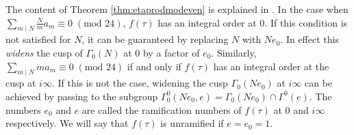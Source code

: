 \documentclass[11pt,a4paper]{amsart}
\theoremstyle{definition}
\begin{document}

The content of Theorem \ref{thm:etaprodmodeven} is explained in \cite[Section 1]{gordon1989multiplicative}. 
In the case when $\sum_{m \mid N} \frac{N}{m}a_m \equiv 0 \;(\textrm{mod }24)$, $f(\tau)$ has an integral order at 0. If this condition is not satisfied for $N$, it can be guaranteed by replacing $N$ with $Ne_0$. In effect this \emph{widens} the cusp of $\Gamma_0(N)$ at 0 by a factor of $e_0$. Similarly,  $\sum_{m \mid N} ma_m \equiv 0 \;(\textrm{mod }24)$ if and only if $f(\tau)$ has an integral order at the cusp at $i\infty$. If this is not the case, widening the cusp $\Gamma_0(Ne_0)$ at $i\infty$ can be achieved by passing to the subgroup $\Gamma_0^0(Ne_0,e)=\Gamma_0(Ne_0) \cap \Gamma^0(e)$. The numbers $e_0$ and $e$ are called the ramification numbers of $f(\tau)$ at $0$ and $i\infty$ respectively. We will say that $f(\tau)$ is unramified if $e=e_0=1$.
\end{document}
